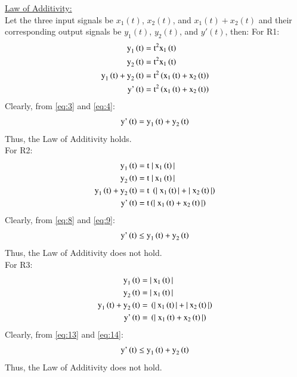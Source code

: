 \documentclass[journal,12pt,twocolumn]{IEEEtran}
\begin{document}
\underline{Law of Additivity:}\\
Let the three input signals be $x_1(t)$, $x_2(t)$, and $x_1(t) + x_2(t)$  and their corresponding output signals be $y_1(t)$, $y_2(t)$, and $y'(t)$, then:
For R1:
\begin{align}
\label{eq:1}
    \text{y}_1\left(\text{t}\right) ={}& \text{t}^2\text{x}_{1}\left(\text{t}\right)\\
    \label{eq:2}
    \text{y}_2\left(\text{t}\right)  ={}& \text{t}^2\text{x}_{1}\left(\text{t}\right)\\
    \label{eq:3}
   \text{y}_1\left(\text{t}\right) +\text{y}_2\left(\text{t}\right)  ={}& \text{t}^2\left(\text{x}_{1}\left(\text{t}\right)+\text{x}_{2}\left(\text{t}\right)\right)\\
   \label{eq:4}
 \text{y'}\left(\text{t}\right) ={}& \text{t}^2\left(\text{x}_{1}\left(\text{t}\right)+\text{x}_{2}\left(\text{t}\right)\right)
\end{align}
Clearly, from \eqref{eq:3} and \eqref{eq:4}:
\begin{align}
\label{eq:5}
    \text{y'}\left(\text{t}\right) = \text{y}_1\left(\text{t}\right) +\text{y}_2\left(\text{t}\right) 
\end{align}
Thus, the Law of Additivity holds.\\
For R2:
\begin{align}
\label{eq:6}
    \text{y}_1\left(\text{t}\right) ={}& \text{t}\; |\:\text{x}_{1}\left(\text{t}\right)|\\
    \label{eq:7}
    \text{y}_2\left(\text{t}\right)  ={}& \text{t}\;|\:\text{x}_{1}\left(\text{t}\right)|\\
    \label{eq:8}
   \text{y}_1\left(\text{t}\right) +\text{y}_2\left(\text{t}\right)  ={}& \text{t}\;\left(|\;\text{x}_{1}\left(\text{t}\right)|+|\;\text{x}_{2}\left(\text{t}\right)|\right)\\
   \label{eq:9}
 \text{y'}\left(\text{t}\right) ={}& \text{t}\left(|\;\text{x}_{1}\left(\text{t}\right)+\text{x}_{2}\left(\text{t}\right)|\right)
\end{align}
Clearly, from \eqref{eq:8} and \eqref{eq:9}:
\begin{align}
\label{eq:10}
    \text{y'}\left(\text{t}\right) \leq \text{y}_1\left(\text{t}\right) +\text{y}_2\left(\text{t}\right) 
\end{align}
Thus, the Law of Additivity does not hold.\\
For R3:
\begin{align}
\label{eq:11}
    \text{y}_1\left(\text{t}\right) ={}& |\:\text{x}_{1}\left(\text{t}\right)|\\
    \label{eq:12}
    \text{y}_2\left(\text{t}\right)  ={}& |\:\text{x}_{1}\left(\text{t}\right)|\\
    \label{eq:13}
   \text{y}_1\left(\text{t}\right) +\text{y}_2\left(\text{t}\right)  ={}& \left(|\:\text{x}_{1}\left(\text{t}\right)|+|\:\text{x}_{2}\left(\text{t}\right)|\right)\\
   \label{eq:14}
 \text{y'}\left(\text{t}\right) ={}& \left(|\;\text{x}_{1}\left(\text{t}\right)+\text{x}_{2}\left(\text{t}\right)|\right)
\end{align}
Clearly, from \eqref{eq:13} and \eqref{eq:14}:
\begin{align}
\label{eq:15}
    \text{y'}\left(\text{t}\right) \leq \text{y}_1\left(\text{t}\right) +\text{y}_2\left(\text{t}\right) 
\end{align}
Thus, the Law of Additivity does not hold.\\
\end{document}
